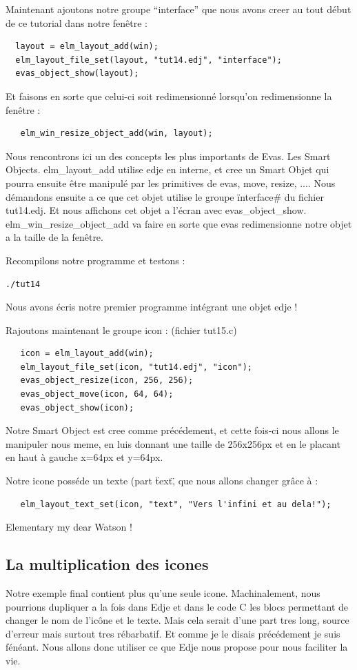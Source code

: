 \documentclass[a4paper]{efr}
\begin{document}
Maintenant ajoutons notre groupe ``interface'' que nous avons creer au tout
début de ce tutorial dans notre fenêtre :

\begin{lstlisting}
  layout = elm_layout_add(win);
  elm_layout_file_set(layout, "tut14.edj", "interface");
  evas_object_show(layout);
\end{lstlisting}

Et faisons en sorte que celui-ci soit redimensionné lorsqu'on redimensionne la
fenêtre :
\begin{lstlisting}
   elm_win_resize_object_add(win, layout);
\end{lstlisting}

Nous rencontrons ici un des concepts les plus importants de Evas. Les Smart
Objects. elm\_layout\_add utilise edje en interne, et cree un Smart Objet qui
pourra ensuite être manipulé par les primitives de evas, move, resize, ....
Nous démandons ensuite a ce que cet objet utilise le groupe \"interface\# du
fichier tut14.edj. Et nous affichons cet objet a l'écran avec
evas\_object\_show. elm\_win\_resize\_object\_add va faire en sorte que evas
redimensionne notre objet a la taille de la fenêtre.

Recompilons notre programme et testons :
\begin{lstlisting}
./tut14
\end{lstlisting}

Nous avons écris notre premier programme intégrant une objet edje !

Rajoutons maintenant le groupe icon : (fichier tut15.c)
\begin{lstlisting}
   icon = elm_layout_add(win);
   elm_layout_file_set(icon, "tut14.edj", "icon");
   evas_object_resize(icon, 256, 256);
   evas_object_move(icon, 64, 64);
   evas_object_show(icon);
\end{lstlisting}

Notre Smart Object est cree comme précédement, et cette fois-ci nous allons
le manipuler nous meme, en luis donnant une taille de 256x256px et en le
placant en haut à gauche x=64px et y=64px.

Notre icone posséde un texte (part \"text\", que nous allons changer grâce à :
\begin{lstlisting}
   elm_layout_text_set(icon, "text", "Vers l'infini et au dela!");
\end{lstlisting}

Elementary my dear Watson !

\subsection{La multiplication des icones}
Notre exemple final contient plus qu'une seule icone. Machinalement, nous
pourrions dupliquer a la fois dans Edje et dans le code C les blocs permettant
de changer le nom de l'icône et le texte. Mais cela serait d'une part tres long,
source d'erreur mais surtout tres rébarbatif. Et comme je le disais précédement
je suis fénéant. Nous allons donc utiliser ce que Edje nous propose pour nous
faciliter la vie.
\end{document}
